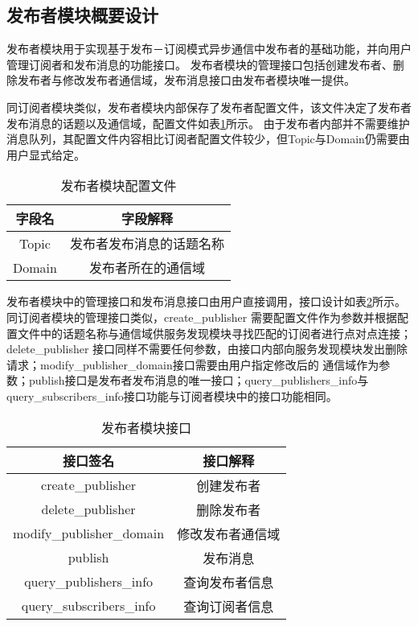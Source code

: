 
\subsection{发布者模块概要设计}
发布者模块用于实现基于发布－订阅模式异步通信中发布者的基础功能，并向用户管理订阅者和发布消息的功能接口。
发布者模块的管理接口包括创建发布者、删除发布者与修改发布者通信域，发布消息接口由发布者模块唯一提供。

同订阅者模块类似，发布者模块内部保存了发布者配置文件，该文件决定了发布者发布消息的话题以及通信域，配置文件如表\ref{publisher_config_file}所示。
由于发布者内部并不需要维护消息队列，其配置文件内容相比订阅者配置文件较少，但Topic与Domain仍需要由用户显式给定。
\begin{table}[htb]
  \centering\small
  \caption{发布者模块配置文件}
  \renewcommand\arraystretch{1.2}
  \label{publisher_config_file}
  \begin{tabular}{cc}
    \toprule
    字段名 & 字段解释 \\
    \midrule
    Topic & 发布者发布消息的话题名称\\
    Domain & 发布者所在的通信域\\
    \bottomrule
  \end{tabular}
\end{table}

发布者模块中的管理接口和发布消息接口由用户直接调用，接口设计如表\ref{publisher_interface}所示。同订阅者模块的管理接口类似，create\_publisher
需要配置文件作为参数并根据配置文件中的话题名称与通信域供服务发现模块寻找匹配的订阅者进行点对点连接；delete\_publisher
接口同样不需要任何参数，由接口内部向服务发现模块发出删除请求；modify\_publisher\_domain接口需要由用户指定修改后的
通信域作为参数；publish接口是发布者发布消息的唯一接口；query\_publishers\_info与query\_subscribers\_info接口功能与订阅者模块中的接口功能相同。
\begin{table}[htb]
  \centering\small
  \renewcommand\arraystretch{1.2}
  \caption{发布者模块接口}
  \label{publisher_interface}
  \begin{tabular}{cc}
    \toprule
    接口签名 & 接口解释 \\
    \midrule
    create\_publisher & 创建发布者\\
    delete\_publisher & 删除发布者\\
    modify\_publisher\_domain & 修改发布者通信域\\
    publish & 发布消息 \\
    query\_publishers\_info & 查询发布者信息\\
    query\_subscribers\_info & 查询订阅者信息\\
    \bottomrule
  \end{tabular}
\end{table}

